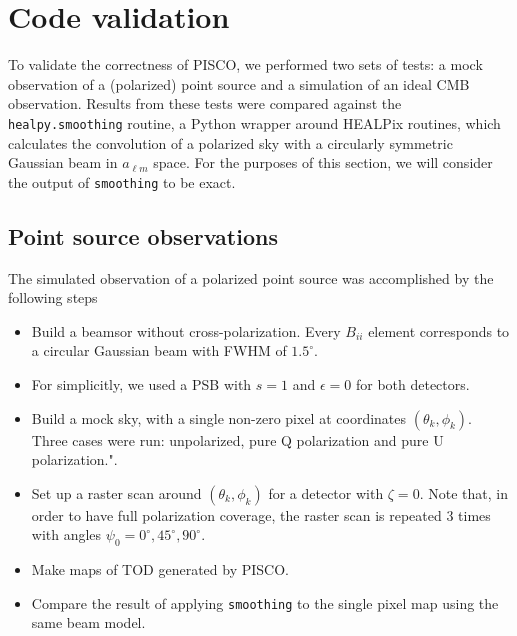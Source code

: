 \documentclass[a4paper,11pt]{article}
\begin{document}
%
\section{Code validation}
\label{sec::validation}

To validate the correctness of PISCO, we performed two sets of tests: a mock observation of a (polarized) point source and a simulation of an ideal CMB observation. Results from these tests were compared against the \texttt{healpy.smoothing} routine, a Python wrapper around HEALPix routines, which calculates the convolution of a polarized sky with a circularly symmetric Gaussian beam in $a_{\ell m}$ space. For the purposes of this section, we will consider the output of \texttt{smoothing} to be exact. 

\subsection{Point source observations}

The simulated observation of a polarized point source was accomplished by the following steps

\begin{itemize}
    \item Build a beamsor without cross-polarization. Every $B_{ii}$ element corresponds to a circular Gaussian beam with FWHM of $1.5^\circ$. 
    \item For simplicitly, we used a PSB with $s=1$ and $\epsilon=0$ for both detectors.
	\item Build a mock sky, with a single non-zero pixel at coordinates $(\theta_k,\phi_k)$. Three cases were run: unpolarized, pure Q polarization and pure U polarization.".
	\item Set up a raster scan around $(\theta_k,\phi_k)$ for a detector with $\zeta=0$. Note that, in order to have full polarization coverage, the raster scan is repeated 3 times with angles $\psi_0 = 0^{\circ},45^{\circ},90^{\circ}$.
	\item Make maps of TOD generated by PISCO.
	\item Compare the result of applying \texttt{smoothing} to the single pixel map using the same beam model.
\end{itemize}
\end{document}
